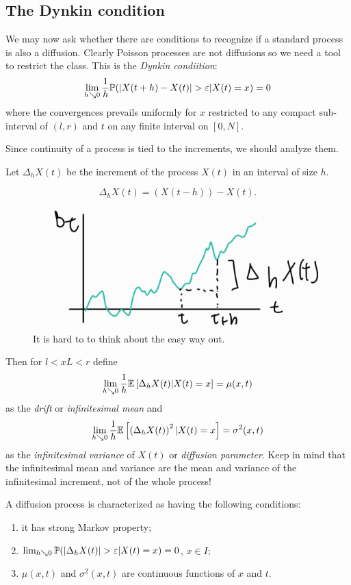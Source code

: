 \documentclass[12pt]{report}
\begin{document}
\subsection{The Dynkin condition}
We may now ask whether there are conditions to recognize if a standard process is also a diffusion. Clearly Poisson processes are not diffusions so we need a tool to restrict the class. This is the \emph{Dynkin condiition}:
\begin{equation*}
	\lim_{h\searrow0}\frac{1}{h}\pr(|X(t+h)-X(t)|>\varepsilon|X(t)=x)=0
\end{equation*}
where the convergences prevails uniformly for $x$ restricted to any compact sub-interval of $(l,r)$ and $t$ on any finite interval on $[0,N]$. \par
Since continuity of a process is tied to the increments, we should analyze them.
\begin{definition}
	Let $\Delta_{h}X(t)$ be the increment of the process $X(t)$ in an interval of size $h$.
\end{definition}
\begin{equation*}
	\Delta_{h}X(t)=(X(t-h))-X(t).
\end{equation*}
\begin{figure}[h]
	\centering
	\includegraphics[width=0.5\linewidth]{img/screenshot048}
	\caption{It is hard to to think about the easy way out.}
	\label{fig:screenshot048}
\end{figure}
Then for $l<xL<r$ define
\begin{equation*}
	\lim_{h\searrow0}\frac{1}{h}\mathbb{E}\left[\Delta_{h}X(t)|X(t)=x\right]=\mu(x,t)
\end{equation*}
as the \emph{drift} or \emph{infinitesimal mean} and
\begin{equation*}
	\lim_{h\searrow0}\frac{1}{h}\mathbb{E}\left[\left(\Delta_{h}X(t)\right)^{2}|X(t)=x\right]=\sigma^{2}(x,t)
\end{equation*}
as the \emph{infinitesimal variance} of $X(t)$ or \emph{diffusion parameter}.
Keep in mind that the infinitesimal mean and variance are the mean and variance of the infinitesimal increment, not of the whole process!
\begin{remark}
	A diffusion process is characterized as having the following conditions:
	\begin{enumerate}
		\item it has strong Markov property;
		\item $\lim_{h\searrow0}\pr(|\Delta_{h}X(t)|>\varepsilon|X(t)=x)=0$, $x\in I$;
		\item $\mu(x,t)$ and $\sigma^{2}(x,t)$ are continuous functions of $x$ and $t$.
	\end{enumerate}
\end{remark}
\end{document}
